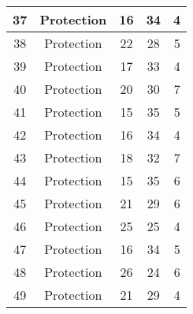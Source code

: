 \documentclass[results.tex]{subfiles}
\begin{document}
\begin{center}
\begin{tabular}{| c || c | c | c | c |}
            \hline
            37                      & Protection                   & 16                     & 34                      & 4                    \\
            \hline
            38                      & Protection                   & 22                     & 28                      & 5                    \\
            \hline
            39                      & Protection                   & 17                     & 33                      & 4                    \\
            \hline
            40                      & Protection                   & 20                     & 30                      & 7                    \\
            \hline
            41                      & Protection                   & 15                     & 35                      & 5                    \\
            \hline
            42                      & Protection                   & 16                     & 34                      & 4                    \\
            \hline
            43                      & Protection                   & 18                     & 32                      & 7                    \\
            \hline
            44                      & Protection                   & 15                     & 35                      & 6                    \\
            \hline
            45                      & Protection                   & 21                     & 29                      & 6                    \\
            \hline
            46                      & Protection                   & 25                     & 25                      & 4                    \\
            \hline
            47                      & Protection                   & 16                     & 34                      & 5                    \\
            \hline
            48                      & Protection                   & 26                     & 24                      & 6                    \\
            \hline
            49                      & Protection                   & 21                     & 29                      & 4                    \\
            \hline
        \end{tabular}
    \end{center}
\end{document}
